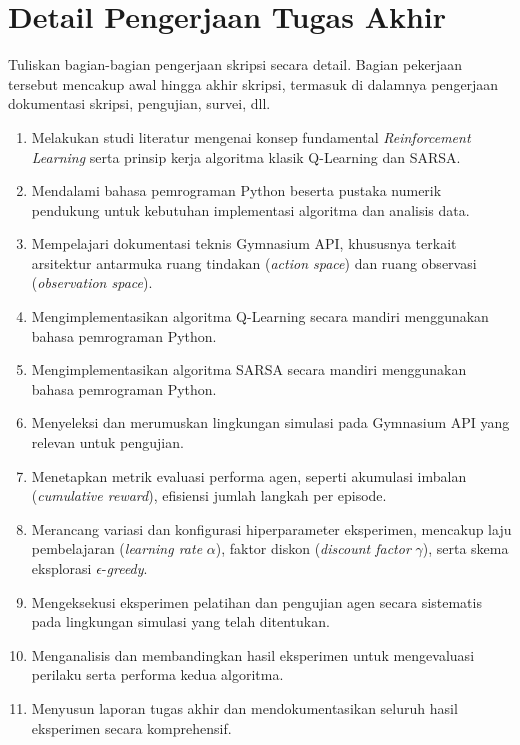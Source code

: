 \documentclass[a4paper,twoside]{article}
\begin{document}
	\section{Detail Pengerjaan Tugas Akhir}
	Tuliskan bagian-bagian pengerjaan skripsi secara detail. Bagian pekerjaan tersebut mencakup awal hingga akhir skripsi, termasuk di dalamnya pengerjaan dokumentasi skripsi, pengujian, survei, dll.
	
	\begin{enumerate}
		\item Melakukan studi literatur mengenai konsep fundamental \textit{Reinforcement Learning} serta prinsip kerja algoritma klasik Q-Learning dan SARSA.
		\item Mendalami bahasa pemrograman Python beserta pustaka numerik pendukung untuk kebutuhan implementasi algoritma dan analisis data.
		\item Mempelajari dokumentasi teknis Gymnasium API, khususnya terkait arsitektur antarmuka ruang tindakan (\textit{action space}) dan ruang observasi (\textit{observation space}).
		\item Mengimplementasikan algoritma Q-Learning secara mandiri menggunakan bahasa pemrograman Python.
		\item Mengimplementasikan algoritma SARSA secara mandiri menggunakan bahasa pemrograman Python.
		\item Menyeleksi dan merumuskan lingkungan simulasi pada Gymnasium API yang relevan untuk pengujian.
		\item Menetapkan metrik evaluasi performa agen, seperti akumulasi imbalan (\textit{cumulative reward}), efisiensi jumlah langkah per episode.
		\item Merancang variasi dan konfigurasi hiperparameter eksperimen, mencakup laju pembelajaran (\textit{learning rate} $\alpha$), faktor diskon (\textit{discount factor} $\gamma$), serta skema eksplorasi $\epsilon$-\textit{greedy}.
		\item Mengeksekusi eksperimen pelatihan dan pengujian agen secara sistematis pada lingkungan simulasi yang telah ditentukan.
		\item Menganalisis dan membandingkan hasil eksperimen untuk mengevaluasi perilaku serta performa kedua algoritma.
		\item Menyusun laporan tugas akhir dan mendokumentasikan seluruh hasil eksperimen secara komprehensif.
	\end{enumerate}
	
\end{document}
